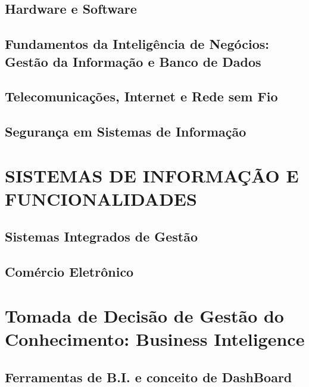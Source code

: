 \documentclass[
]{book}
\begin{document}
\section{Hardware e Software}\label{hardware-e-software}

\section{Fundamentos da Inteligência de Negócios: Gestão da Informação e Banco de Dados}\label{fundamentos-da-inteliguxeancia-de-neguxf3cios-gestuxe3o-da-informauxe7uxe3o-e-banco-de-dados}

\section{Telecomunicações, Internet e Rede sem Fio}\label{telecomunicauxe7uxf5es-internet-e-rede-sem-fio}

\section{Segurança em Sistemas de Informação}\label{seguranuxe7a-em-sistemas-de-informauxe7uxe3o}

\chapter{SISTEMAS DE INFORMAÇÃO E FUNCIONALIDADES}\label{sistemas-de-informauxe7uxe3o-e-funcionalidades}

\section{Sistemas Integrados de Gestão}\label{sistemas-integrados-de-gestuxe3o}

\section{Comércio Eletrônico}\label{comuxe9rcio-eletruxf4nico}

\chapter{Tomada de Decisão de Gestão do Conhecimento: Business Inteligence}\label{tomada-de-decisuxe3o-de-gestuxe3o-do-conhecimento-business-inteligence}

\section{Ferramentas de B.I. e conceito de DashBoard}\label{ferramentas-de-b.i.-e-conceito-de-dashboard}
\end{document}
